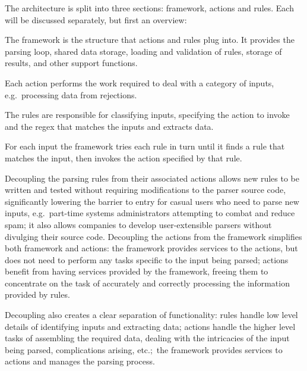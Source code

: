 \documentclass{svmult}
\begin{document}
\label{Architecture}

The architecture is split into three sections: framework, actions and
rules.  Each will be discussed separately, but first an overview:

\begin{description}[Framework]

    \item [Framework]  The framework is the structure that actions and
        rules plug into.  It provides the parsing loop, shared data
        storage, loading and validation of rules, storage of results, and
        other support functions.

    \item [Actions]  Each action performs the work required to deal with a
        category of inputs, e.g.\ processing data from rejections.

    \item [Rules]  The rules are responsible for classifying
        inputs, specifying the action to invoke and the regex that matches
        the inputs and extracts data.

\end{description}

For each input the framework tries each rule in turn until it finds a rule
that matches the input, then invokes the action specified by that rule.

Decoupling the parsing rules from their associated actions allows new rules
to be written and tested without requiring modifications to the parser
source code, significantly lowering the barrier to entry for casual users
who need to parse new inputs, e.g.\ part-time systems administrators
attempting to combat and reduce spam; it also allows companies to develop
user-extensible parsers without divulging their source code.  Decoupling
the actions from the framework simplifies both framework and actions: the
framework provides services to the actions, but does not need to perform
any tasks specific to the input being parsed; actions benefit from having
services provided by the framework, freeing them to concentrate on the task
of accurately and correctly processing the information provided by rules.

Decoupling also creates a clear separation of functionality: rules handle
low level details of identifying inputs and extracting data; actions handle
the higher level tasks of assembling the required data, dealing with the
intricacies of the input being parsed, complications arising, etc.;\ the
framework provides services to actions and manages the parsing process.
\end{document}
